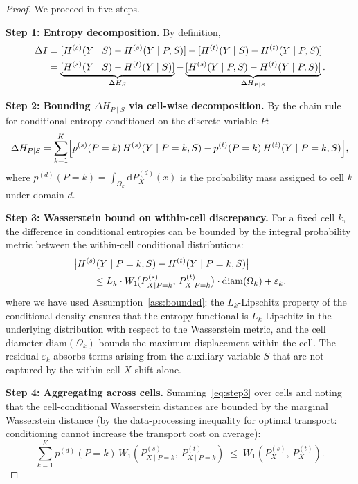 \documentclass[12pt,a4paper]{article}
\newcommand{\Wass}{W_1}
\newcommand{\diam}{\mathrm{diam}}
\begin{document}
\begin{proof}
We proceed in five steps.

\medskip\noindent
\textbf{Step 1: Entropy decomposition.}
By definition,
\begin{align}
    \Delta I &= [H^{(s)}(Y\mid S) - H^{(s)}(Y\mid P,S)]
               - [H^{(t)}(Y\mid S) - H^{(t)}(Y\mid P,S)] \notag\\
             &= \underbrace{[H^{(s)}(Y\mid S) - H^{(t)}(Y\mid S)]}_{\Delta H_S}
                - \underbrace{[H^{(s)}(Y\mid P,S) -
                  H^{(t)}(Y\mid P,S)]}_{\Delta H_{P\mid S}}.
                \label{eq:decomp-step1}
\end{align}

\medskip\noindent
\textbf{Step 2: Bounding $\Delta H_{P\mid S}$ via cell-wise decomposition.}
By the chain rule for conditional entropy conditioned on the discrete
variable $P$:
\begin{equation}\label{eq:step2}
    \Delta H_{P\mid S} =
    \sum_{k=1}^{K} \Bigl[
        p^{(s)}(P=k)\,H^{(s)}(Y\mid P=k,S)
        - p^{(t)}(P=k)\,H^{(t)}(Y\mid P=k,S)
    \Bigr],
\end{equation}
where $p^{(d)}(P=k)=\int_{\Omega_k} \mathrm{d}P^{(d)}_X(x)$ is the
probability mass assigned to cell $k$ under domain $d$.

\medskip\noindent
\textbf{Step 3: Wasserstein bound on within-cell discrepancy.}
For a fixed cell $k$, the difference in conditional entropies can be
bounded by the integral probability metric between the within-cell
conditional distributions:
\begin{align}
    &\bigl|H^{(s)}(Y\mid P=k,S) - H^{(t)}(Y\mid P=k,S)\bigr| \notag\\
    &\qquad\leq
    L_k \cdot \Wass\!\bigl(P^{(s)}_{X\mid P=k},\,P^{(t)}_{X\mid P=k}\bigr)
    \cdot \diam(\Omega_k) + \varepsilon_k,
    \label{eq:step3}
\end{align}
where we have used Assumption~\ref{ass:bounded}: the $L_k$-Lipschitz
property of the conditional density ensures that the entropy functional
is $L_k$-Lipschitz in the underlying distribution with respect to the
Wasserstein metric, and the cell diameter $\diam(\Omega_k)$ bounds the
maximum displacement within the cell.  The residual $\varepsilon_k$
absorbs terms arising from the auxiliary variable $S$ that are not
captured by the within-cell $X$-shift alone.

\medskip\noindent
\textbf{Step 4: Aggregating across cells.}
Summing~\eqref{eq:step3} over cells and noting that the cell-conditional
Wasserstein distances are bounded by the marginal Wasserstein distance
(by the data-processing inequality for optimal transport:
conditioning cannot increase the transport cost on average):
\begin{equation}\label{eq:step4}
    \sum_{k=1}^{K} p^{(d)}(P=k)\,
    \Wass(P^{(s)}_{X\mid P=k},\,P^{(t)}_{X\mid P=k})
    \;\leq\; \Wass(P^{(s)}_X,\,P^{(t)}_X).
\end{equation}


\end{proof}
\end{document}
